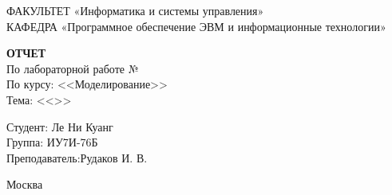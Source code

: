 \begin{titlepage}
	{\doublespacing \normalsize \raggedright ФАКУЛЬТЕТ \hspace{25mm} «Информатика и системы управления»\\
	КАФЕДРА \hspace{5mm} «Программное обеспечение ЭВМ и информационные технологии»\\}

	\vspace{30mm}
	
	\textbf{ОТЧЕТ}\\
	По лабораторной работе №\lab\\
	По курсу: <<Моделирование>>\\
	Тема: <<\topic>>\\

	\vspace{60mm}

	\hspace{70mm} Студент:      \hfill Ле Ни Куанг\\
	\hspace{70mm} Группа:       \hfill ИУ7И-76Б\\
	\hspace{70mm} Преподаватель:\hfill Рудаков И. В.\\

	\vfill
	
	Москва\\
	\the\year
\end{titlepage}
